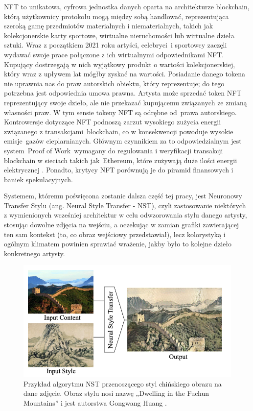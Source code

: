 \documentclass[12pt]{article}
\begin{document}
NFT to unikatowa, cyfrowa jednostka danych oparta na architekturze blockchain, którą użytkownicy protokołu mogą między sobą handlować, reprezentująca szeroką gamę przedmiotów materialnych i niematerialnych, takich jak kolekcjonerskie karty sportowe, wirtualne nieruchomości lub wirtualne dzieła sztuki. Wraz z początkiem 2021 roku artyści, celebryci i sportowcy zaczęli wydawać swoje prace połączone z ich wirtualnymi odpowiednikami NFT. Kupujący dostrzegają w nich wyjątkowy produkt o wartości kolekcjonerskiej, który wraz z upływem lat mógłby zyskać na wartości. Posiadanie danego tokena nie uprawnia nas do praw autorskich obiektu, który reprezentuje; do tego potrzebna jest odpowiednia umowa prawna. Artysta może sprzedać token NFT reprezentujący swoje dzieło, ale nie przekazać kupującemu związanych ze zmianą własności praw. W tym sensie tokeny NFT są odrębne od prawa autorskiego. Kontrowersje dotyczące NFT podnoszą zarzut wysokiego zużycia energii związanego z transakcjami blockchain, co w konsekwencji powoduje wysokie emisje gazów cieplarnianych. Głównym czynnikiem za to odpowiedzialnym jest system Proof of Work wymagany do regulowania i weryfikacji transakcji blockchain w sieciach takich jak Ethereum, które zużywają duże ilości energii elektrycznej \cite{62}. Ponadto, krytycy NFT porównują je do piramid finansowych i baniek spekulacyjnych.

Systemem, któremu poświęcona zostanie dalsza część tej pracy, jest Neuronowy Transfer Stylu (ang. Neural Style Transfer - NST), czyli zastosowanie niektórych z wymienionych wcześniej architektur w celu odwzorowania stylu danego artysty, stosując dowolne zdjęcia na wejściu, a oczekując w zamian grafiki zawierającej ten sam kontekst (to, co obraz wejściowy przedstawiał), lecz kolorystyką i ogólnym klimatem powinien sprawiać wrażenie, jakby było to kolejne dzieło konkretnego artysty.

\begin{figure}[H]
    \centering
    \includegraphics[width=\textwidth]{u5.png}
    \caption{Przykład algorytmu NST przenoszącego styl chińskiego obrazu na dane zdjęcie. Obraz stylu nosi nazwę „Dwelling in the Fuchun Mountains” i jest autorstwa Gongwang Huang \cite{22}.}
    \label{fig:2}
\end{figure}
\newpage
\end{document}
